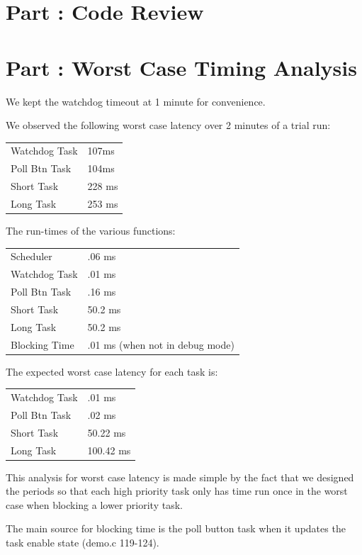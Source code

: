 \documentclass{article}
\newcounter{partNum}
\newcommand{\partNum}{%
        \stepcounter{partNum}%
        \thepartNum}
\newcommand{\sectPart}[1]{\section*{Part \partNum: #1}}
\begin{document}

\sectPart{Code Review}


\sectPart{Worst Case Timing Analysis}

We kept the watchdog timeout at 1 minute for convenience.

We observed the following worst case latency over 2 minutes of a trial run:

\begin{tabular}{l | l}
Watchdog Task & 107ms \\
Poll Btn Task & 104ms \\
Short Task & 228 ms \\
Long Task & 253 ms \\ 
\end{tabular}

The run-times of the various functions:

\begin{tabular}{l | l}
Scheduler & .06 ms \\
Watchdog Task & .01 ms \\
Poll Btn Task & .16 ms \\
Short Task & 50.2 ms \\
Long Task & 50.2 ms \\ 
Blocking Time & .01 ms (when not in debug mode) \\
\end{tabular}

The expected worst case latency for each task is:

\begin{tabular}{l | l}
Watchdog Task & .01 ms \\
Poll Btn Task & .02 ms \\
Short Task & 50.22 ms \\
Long Task & 100.42 ms \\ 
\end{tabular}

This analysis for worst case latency is made simple by the fact that we designed the periods so that each high priority task only has time run once in the worst case when blocking a lower priority task.

The main source for blocking time is the poll button task when it updates the task enable state (demo.c 119-124).

\end{document}
